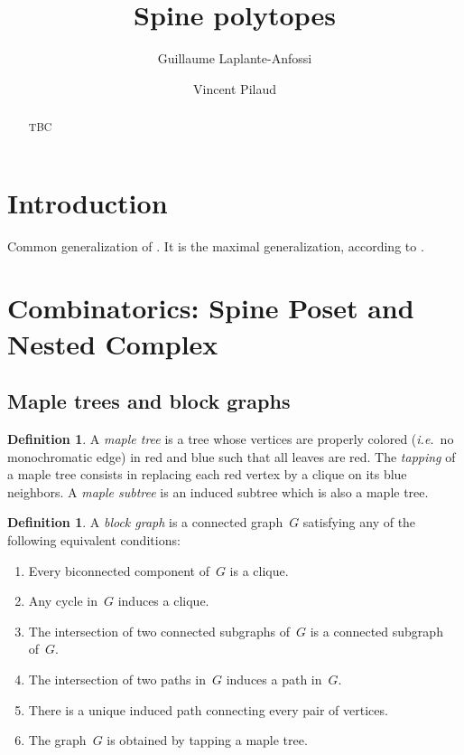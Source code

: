 \documentclass{amsart}
\title{Spine polytopes}
\author{Guillaume Laplante-Anfossi}
\author{Vincent Pilaud}
\theoremstyle{definition}
\newtheorem{definition}[theorem]{Definition}
\newcommand{\ie}{\textit{i.e.}~} %
\newcommand{\darkblue}{\color{darkblue}} %
\newcommand{\defn}[1]{\textsl{\darkblue #1}} %
\begin{document}
\begin{abstract}
TBC
\end{abstract}

\maketitle

\tableofcontents


\newpage
\section*{Introduction}

Common generalization of \cite{Pilaud-signedTreeAssociahedraFPSAC, LangePilaud, PilaudPons-permutrees, Laplante-diagonalOperahedra}.
It is the maximal generalization, according to \cite{Pilaud-removahedra}.


\newpage
\section{Combinatorics: Spine Poset and Nested Complex}


\subsection{Maple trees and block graphs}
\label{subsec:MapleTreesBlockGraphs}

\begin{definition}
  A \defn{maple tree} is a tree whose vertices are properly colored (\ie no monochromatic edge) in red and blue such that all leaves are red.
  The \defn{tapping} of a maple tree consists in replacing each red vertex by a clique on its blue neighbors.
  A \defn{maple subtree} is an induced subtree which is also a maple tree.
\end{definition}

\begin{definition}
  \label{def:blockgraph}
  A \defn{block graph} is a connected graph~$G$ satisfying any of the following equivalent conditions:
  \begin{enumerate}
    \item Every biconnected component of~$G$ is a clique.
    \item Any cycle in~$G$ induces a clique.
    \item The intersection of two connected subgraphs of~$G$ is a connected subgraph of~$G$.
    \item The intersection of two paths in~$G$ induces a path in~$G$.
    \item There is a unique induced path connecting every pair of vertices.
    \item The graph~$G$ is obtained by tapping a maple tree.
  \end{enumerate}
\end{definition}
\end{document}
